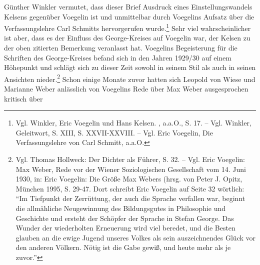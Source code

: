 \documentclass[12pt,a4paper,ngerman]{article}
\begin{document}
Günther Winkler vermutet, dass dieser Brief Ausdruck eines Einstellungswandels
Kelsens gegenüber Voegelin ist und unmittelbar durch Voegelins Aufsatz über
die Verfassungslehre Carl Schmitts hervorgerufen wurde.\footnote{Vgl. Winkler,
  Eric Voegelin und Hans Kelsen. , a.a.O., S. 17. -- Vgl. Winkler, Geleitwort,
  S. XIII, S. XXVII-XXVIII. -- Vgl. Eric Voegelin, Die Verfassungslehre von
  Carl Schmitt, a.a.O.} Sehr viel wahrscheinlicher ist aber, dass es der
Einfluss des George-Kreises auf Voegelin war, der Kelsen zu der oben zitierten
Bemerkung veranlasst hat. Voegelins Begeisterung für die Schriften des
George-Kreises befand sich in den Jahren 1929/30 auf einem Höhepunkt und
schlägt sich zu dieser Zeit sowohl in seinem Stil als auch in seinen Ansichten
nieder.\footnote{Vgl.  Thomas Hollweck: Der Dichter als Führer, S. 32. -- Vgl.
  Eric Voegelin: Max Weber, Rede vor der Wiener Soziologischen Gesellschaft
  vom 14. Juni 1930, in: Eric Voegelin: Die Größe Max Webers (hrsg. von Peter
  J. Opitz, München 1995, S.  29-47. Dort schreibt Eric Voegelin auf Seite 32
  wörtlich: "`Im Tiefpunkt der Zerrüttung, der auch die Sprache verfallen war,
  beginnt die allmähliche Neugewinnung des Bildungsgutes in Philosophie und
  Geschichte und ersteht der Schöpfer der Sprache in Stefan George. Das Wunder
  der wiederholten Erneuerung wird viel beredet, und die Besten glauben an die
  ewige Jugend unseres Volkes als sein auszeichnendes Glück vor den anderen
  Völkern. Nötig ist die Gabe gewiß, und heute mehr als je zuvor."'}  Schon
einige Monate zuvor hatten sich Leopold von Wiese und Marianne Weber
anlässlich von Voegelins Rede über Max Weber ausgesprochen kritisch über
\end{document}
